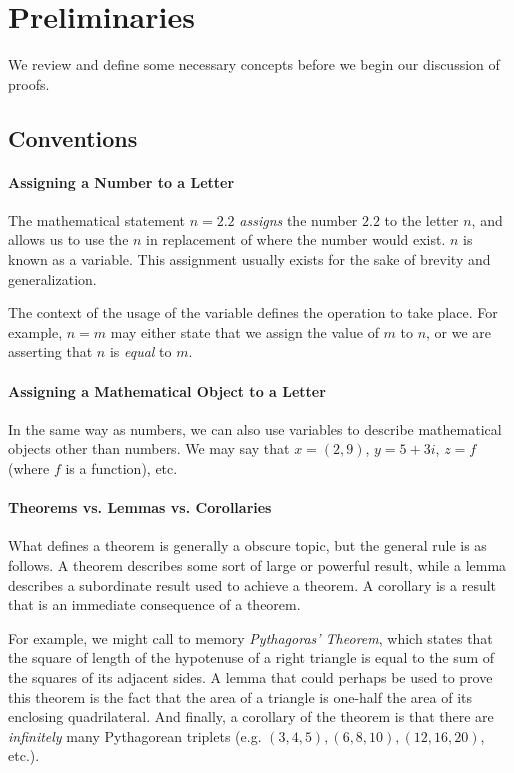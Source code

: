 \chapter{Preliminaries}
We review and define some necessary concepts before we begin our discussion of proofs.
\section{Conventions}
  \subsubsection*{Assigning a Number to a Letter}
  The mathematical statement $n = 2.2$ \emph{assigns} the number $2.2$ to the letter $n$,
  and allows us to use the $n$ in replacement of where the number would exist. $n$ is known as a variable.
  This assignment usually exists for the sake of brevity and generalization.

  The context of the usage of the variable defines the operation to take place.
  For example, $n = m$ may either state that we assign the value of $m$ to $n$, or
  we are asserting that $n$ is \emph{equal} to $m$.

  \subsubsection{Assigning a Mathematical Object to a Letter}
  In the same way as numbers, we can also use variables to describe mathematical
  objects other than numbers.
  We may say that $x = (2, 9)$, $y = 5 + 3i$, $z = f$ (where $f$ is a function), etc.

  \subsubsection*{Theorems vs. Lemmas vs. Corollaries}
  What defines a theorem is generally a obscure topic, but the general rule is as follows.
  A theorem describes some sort of large or powerful result, while a lemma describes
  a subordinate result used to achieve a theorem. A corollary is a result that
  is an immediate consequence of a theorem.

  For example, we might call to memory \emph{Pythagoras' Theorem}, which states
  that the square of length of the hypotenuse of a right triangle is equal to
  the sum of the squares of its adjacent sides. A lemma that could perhaps be used
  to prove this theorem is the fact that the area of a triangle is one-half the area
  of its enclosing quadrilateral. And finally, a corollary of the theorem is
  that there are \emph{infinitely} many Pythagorean triplets (e.g. $(3, 4, 5), (6, 8, 10), (12, 16, 20)$, etc.).

